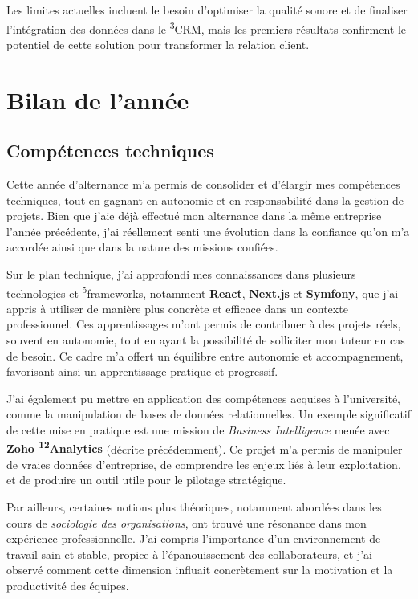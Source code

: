 Les limites actuelles incluent le besoin d’optimiser la qualité sonore et de finaliser l’intégration des données dans le \textsuperscript{3}CRM, mais les premiers résultats confirment le potentiel de cette solution pour transformer la relation client.






\section{Bilan de l’année}
\label{bilan}

\subsection{Compétences techniques}

Cette année d’alternance m’a permis de consolider et d’élargir mes compétences techniques, tout en gagnant en autonomie et en responsabilité dans la gestion de projets. Bien que j’aie déjà effectué mon alternance dans la même entreprise l’année précédente, j’ai réellement senti une évolution dans la confiance qu’on m’a accordée ainsi que dans la nature des missions confiées.

Sur le plan technique, j’ai approfondi mes connaissances dans plusieurs technologies et \textsuperscript{5}frameworks, notamment \textbf{React}, \textbf{Next.js} et \textbf{Symfony}, que j’ai appris à utiliser de manière plus concrète et efficace dans un contexte professionnel. Ces apprentissages m’ont permis de contribuer à des projets réels, souvent en autonomie, tout en ayant la possibilité de solliciter mon tuteur en cas de besoin. Ce cadre m’a offert un équilibre entre autonomie et accompagnement, favorisant ainsi un apprentissage pratique et progressif.

J’ai également pu mettre en application des compétences acquises à l’université, comme la manipulation de bases de données relationnelles. Un exemple significatif de cette mise en pratique est une mission de \textit{Business Intelligence} menée avec \textbf{ Zoho \textsuperscript{12}Analytics} (décrite précédemment). Ce projet m’a permis de manipuler de vraies données d’entreprise, de comprendre les enjeux liés à leur exploitation, et de produire un outil utile pour le pilotage stratégique.

Par ailleurs, certaines notions plus théoriques, notamment abordées dans les cours de \textit{sociologie des organisations}, ont trouvé une résonance dans mon expérience professionnelle. J’ai compris l’importance d’un environnement de travail sain et stable, propice à l’épanouissement des collaborateurs, et j’ai observé comment cette dimension influait concrètement sur la motivation et la productivité des équipes.

